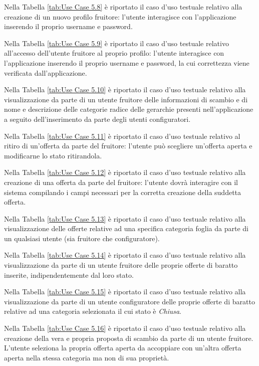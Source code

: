 Nella Tabella \ref{tab:Use Case 5.8} è riportato il caso d'uso testuale relativo alla creazione di un nuovo profilo fruitore: l'utente interagisce con l'applicazione inserendo il proprio username e password.\bigskip

Nella Tabella \ref{tab:Use Case 5.9} è riportato il caso d'uso testuale relativo all'accesso dell'utente fruitore al proprio profilo: l'utente interagisce con l'applicazione inserendo il proprio username e password, la cui correttezza viene verificata dall'applicazione.\bigskip

Nella Tabella \ref{tab:Use Case 5.10} è riportato il caso d'uso testuale relativo alla visualizzazione da parte di un utente fruitore delle informazioni di scambio e di nome e descrizione delle categorie radice delle gerarchie presenti nell'applicazione a seguito dell'inserimento da parte degli utenti configuratori.\bigskip

Nella Tabella \ref{tab:Use Case 5.11} è riportato il caso d'uso testuale relativo al ritiro di un'offerta da parte del fruitore: l'utente può scegliere un'offerta aperta e modificarne lo stato ritirandola.\bigskip

Nella Tabella \ref{tab:Use Case 5.12} è riportato il caso d'uso testuale relativo alla creazione di una offerta da parte del fruitore: l'utente dovrà interagire con il sistema compilando i campi necessari per la corretta creazione della suddetta offerta.\bigskip

Nella Tabella \ref{tab:Use Case 5.13} è riportato il caso d'uso testuale relativo alla visualizzazione delle offerte relative ad una specifica categoria foglia da parte di un qualsiasi utente (sia fruitore che configuratore).\bigskip

Nella Tabella \ref{tab:Use Case 5.14} è riportato il caso d'uso testuale relativo alla visualizzazione da parte di un utente fruitore delle proprie offerte di baratto inserite, indipendentemente dal loro stato.\bigskip

Nella Tabella \ref{tab:Use Case 5.15} è riportato il caso d'uso testuale relativo alla visualizzazione da parte di un utente configuratore delle proprie offerte di baratto relative ad una categoria selezionata il cui stato è \textit{Chiusa}.\bigskip

Nella Tabella \ref{tab:Use Case 5.16} è riportato il caso d'uso testuale relativo alla creazione della vera e propria proposta di scambio da parte di un utente fruitore. L'utente seleziona la propria offerta aperta da accoppiare con un'altra offerta aperta nella stessa categoria ma non di sua proprietà.\bigskip

